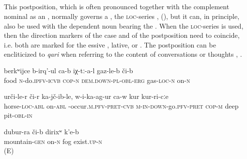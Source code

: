 
\subsection{ }
\label{ssec:postposition ci}

This postposition, which is often pronounced together with the complement nominal as an , normally governs a , the \textsc{loc}-series ,  (), but it can, in principle, also be used with the dependent noun bearing the  . When the \textsc{loc}-series is used, then the direction markers of the case and of the postposition need to coincide, i.e. both are marked for the essive , lative, or  . The postposition can be encliticized to \textit{qari} when referring to the content of conversations or thoughts , . 
%
\begin{exe}
	\ex
	\begin{xlist}
		\ex	\label{They are making food on a gas cooker}
		\gll	berkʷijce	b-irq'-ul	ca-b	iχ-tː-a-l	gaz-le-b	či-b  \\
			food	\textsc{n}-do.\textsc{ipfv}-\textsc{icvb} \textsc{cop}-\textsc{n}	\textsc{dem.down}-\textsc{pl}-\textsc{obl}-\textsc{erg}		gas-\textsc{loc}-\textsc{n}	on-\textsc{n}\\
		\glt	{}

		\ex	\label{He fell down from the horse into a deep pit}
		\gll	urči-le-r	či-r	ka-jč-ib-le,	w-i-ka-ag-ur	ca-w	kur	kur-ri-cːe   \\
			horse-\textsc{loc}-\textsc{abl}	on-\textsc{abl}	-occur.\textsc{m}.\textsc{pfv}-\textsc{pret}-\textsc{cvb}	\textsc{m-in-down}-go.\textsc{pfv}-\textsc{pret}	\textsc{cop-m}	deep	pit-\textsc{obl}-\textsc{in}\\
		\glt	{}

		\ex	\label{There is fog on / above the mountain}
		\gll	dubur-ra	či-b	dirixʷ	k'e-b\\
			mountain-\textsc{gen}	on-\textsc{n}	fog	exist.\textsc{up-n}\\
		\glt	{} (E)
	\end{xlist}
\end{exe}

